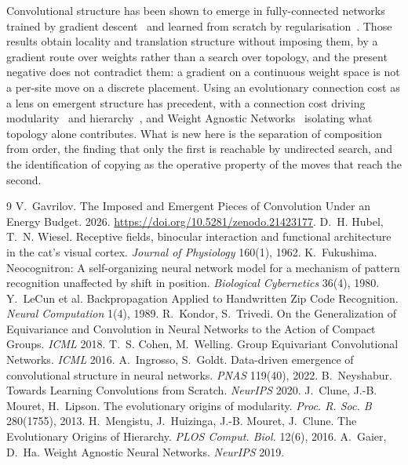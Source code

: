 \documentclass[11pt]{article}
\begin{document}
Convolutional structure has been shown to emerge in fully-connected networks trained by gradient
descent~\cite{ingrosso} and learned from scratch by regularisation~\cite{neyshabur}. Those results obtain
locality and translation structure without imposing them, by a gradient route over weights rather than a
search over topology, and the present negative does not contradict them: a gradient on a continuous
weight space is not a per-site move on a discrete placement. Using an evolutionary connection cost as a
lens on emergent structure has precedent, with a connection cost driving modularity~\cite{clune} and
hierarchy~\cite{mengistu}, and Weight Agnostic Networks~\cite{wann} isolating what topology alone
contributes. What is new here is the separation of composition from order, the finding that only the
first is reachable by undirected search, and the identification of copying as the operative property of
the moves that reach the second.

\begin{thebibliography}{9}\setlength{\itemsep}{0pt}
 V.~Gavrilov. The Imposed and Emergent Pieces of Convolution Under an Energy Budget.
 2026. \url{https://doi.org/10.5281/zenodo.21423177}.
 D.~H. Hubel, T.~N. Wiesel. Receptive fields, binocular interaction and functional
 architecture in the cat's visual cortex. \emph{Journal of Physiology} 160(1), 1962.
 K.~Fukushima. Neocognitron: A self-organizing neural network model for a mechanism
 of pattern recognition unaffected by shift in position. \emph{Biological Cybernetics} 36(4), 1980.
 Y.~LeCun et al. Backpropagation Applied to Handwritten Zip Code Recognition.
 \emph{Neural Computation} 1(4), 1989.
 R.~Kondor, S.~Trivedi. On the Generalization of Equivariance and Convolution in Neural
 Networks to the Action of Compact Groups. \emph{ICML} 2018.
 T.~S. Cohen, M.~Welling. Group Equivariant Convolutional Networks.
 \emph{ICML} 2016.
 A.~Ingrosso, S.~Goldt. Data-driven emergence of convolutional structure in neural
 networks. \emph{PNAS} 119(40), 2022.
 B.~Neyshabur. Towards Learning Convolutions from Scratch. \emph{NeurIPS} 2020.
 J.~Clune, J.-B. Mouret, H.~Lipson. The evolutionary origins of modularity.
 \emph{Proc. R. Soc. B} 280(1755), 2013.
 H.~Mengistu, J.~Huizinga, J.-B. Mouret, J.~Clune. The Evolutionary Origins of
 Hierarchy. \emph{PLOS Comput. Biol.} 12(6), 2016.
 A.~Gaier, D.~Ha. Weight Agnostic Neural Networks. \emph{NeurIPS} 2019.
\end{thebibliography}
\end{document}

